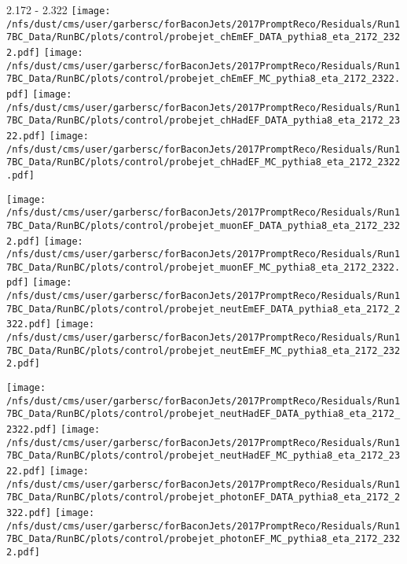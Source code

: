\documentclass[t,compress]{beamer}
\begin{document}
\begin{frame}{2.172 - 2.322}
	\texttt{[image: /nfs/dust/cms/user/garbersc/forBaconJets/2017PromptReco/Residuals/Run17BC\_Data/RunBC/plots/control/probejet\_chEmEF\_DATA\_pythia8\_eta\_2172\_2322.pdf]}
	\texttt{[image: /nfs/dust/cms/user/garbersc/forBaconJets/2017PromptReco/Residuals/Run17BC\_Data/RunBC/plots/control/probejet\_chEmEF\_MC\_pythia8\_eta\_2172\_2322.pdf]}
	\texttt{[image: /nfs/dust/cms/user/garbersc/forBaconJets/2017PromptReco/Residuals/Run17BC\_Data/RunBC/plots/control/probejet\_chHadEF\_DATA\_pythia8\_eta\_2172\_2322.pdf]}
	\texttt{[image: /nfs/dust/cms/user/garbersc/forBaconJets/2017PromptReco/Residuals/Run17BC\_Data/RunBC/plots/control/probejet\_chHadEF\_MC\_pythia8\_eta\_2172\_2322.pdf]}
\newline

\vspace{-0.65cm}
	\texttt{[image: /nfs/dust/cms/user/garbersc/forBaconJets/2017PromptReco/Residuals/Run17BC\_Data/RunBC/plots/control/probejet\_muonEF\_DATA\_pythia8\_eta\_2172\_2322.pdf]}
	\texttt{[image: /nfs/dust/cms/user/garbersc/forBaconJets/2017PromptReco/Residuals/Run17BC\_Data/RunBC/plots/control/probejet\_muonEF\_MC\_pythia8\_eta\_2172\_2322.pdf]}
	\texttt{[image: /nfs/dust/cms/user/garbersc/forBaconJets/2017PromptReco/Residuals/Run17BC\_Data/RunBC/plots/control/probejet\_neutEmEF\_DATA\_pythia8\_eta\_2172\_2322.pdf]}
	\texttt{[image: /nfs/dust/cms/user/garbersc/forBaconJets/2017PromptReco/Residuals/Run17BC\_Data/RunBC/plots/control/probejet\_neutEmEF\_MC\_pythia8\_eta\_2172\_2322.pdf]}
\newline

\vspace{-0.65cm}
	\texttt{[image: /nfs/dust/cms/user/garbersc/forBaconJets/2017PromptReco/Residuals/Run17BC\_Data/RunBC/plots/control/probejet\_neutHadEF\_DATA\_pythia8\_eta\_2172\_2322.pdf]}
	\texttt{[image: /nfs/dust/cms/user/garbersc/forBaconJets/2017PromptReco/Residuals/Run17BC\_Data/RunBC/plots/control/probejet\_neutHadEF\_MC\_pythia8\_eta\_2172\_2322.pdf]}
	\texttt{[image: /nfs/dust/cms/user/garbersc/forBaconJets/2017PromptReco/Residuals/Run17BC\_Data/RunBC/plots/control/probejet\_photonEF\_DATA\_pythia8\_eta\_2172\_2322.pdf]}
	\texttt{[image: /nfs/dust/cms/user/garbersc/forBaconJets/2017PromptReco/Residuals/Run17BC\_Data/RunBC/plots/control/probejet\_photonEF\_MC\_pythia8\_eta\_2172\_2322.pdf]}
\end{frame}
\end{document}
